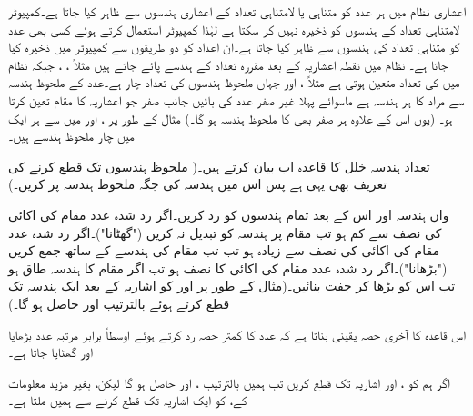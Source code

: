 اعشاری نظام میں ہر عدد کو متناہی یا لامتناہی تعداد کے اعشاری ہندسوں سے ظاہر کیا جاتا ہے۔کمپیوٹر لامتناہی تعداد کے ہندسوں کو ذخیرہ نہیں کر سکتا ہے لہٰذا کمپیوٹر استعمال کرتے ہوئے کسی بھی عدد کو متناہی تعداد کی ہندسوں سے ظاہر کیا جاتا ہے۔ان اعداد کو دو طریقوں سے کمپیوٹر میں  ذخیرہ کیا جاتا ہے۔  نظام میں نقطہ اعشاریہ کے بعد مقررہ تعداد کے ہندسے  پائے جاتے ہیں مثلاً ، ،  جبکہ  نظام میں  کی تعداد متعین ہوتی ہے مثلاً ،  اور  جہاں ملحوظ ہندسوں کی تعداد چار ہے۔عدد  کے ملحوظ ہندسہ سے مراد  کا ہر ہندسہ ہے ماسوائے پہلا غیر صفر عدد کی بائیں جانب صفر جو اعشاریہ کا مقام تعین کرتا ہو۔ (یوں اس کے علاوہ ہر صفر بھی  کا ملحوظ ہندسہ ہو گا۔) مثال کے طور پر ،  اور  میں سے ہر ایک میں چار ملحوظ ہندسے ہیں۔

تعداد ہندسہ خلل کا قاعدہ اب بیان کرتے ہیں۔( ملحوظ ہندسوں تک قطع کرنے کی تعریف بھی یہی ہے پس اس میں ہندسہ کی جگہ ملحوظ ہندسہ پر کریں۔)

 واں ہندسہ اور اس کے بعد تمام ہندسوں کو رد کریں۔اگر رد شدہ عدد مقام  کی اکائی کی نصف سے کم ہو تب مقام  پر ہندسہ کو تبدیل نہ کریں ("گھٹانا")۔اگر رد شدہ عدد مقام  کی اکائی کی نصف سے زیادہ ہو تب تب مقام  کی ہندسے کے ساتھ  جمع کریں ("بڑھانا")۔اگر رد شدہ عدد مقام  کی اکائی کا نصف ہو تب اگر مقام  کا ہندسہ طاق ہو تب اس کو بڑھا کر جفت بنائیں۔(مثال کے طور پر  اور  کو اشاریہ کے بعد ایک ہندسہ تک قطع کرتے ہوئے بالترتیب  اور  حاصل ہو گا۔)

اس قاعدہ کا آخری حصہ یقینی بناتا ہے کہ  عدد کا کمتر حصہ رد کرتے ہوئے اوسطاً برابر مرتبہ عدد بڑھایا اور گھٹایا جاتا ہے۔ 

اگر ہم  کو ،  اور  اشاریہ تک قطع کریں تب ہمیں بالترتیب ،  اور  حاصل ہو گا لیکن، بغیر مزید  معلومات کے،  کو ایک اشاریہ تک قطع کرنے سے ہمیں  ملتا ہے۔


